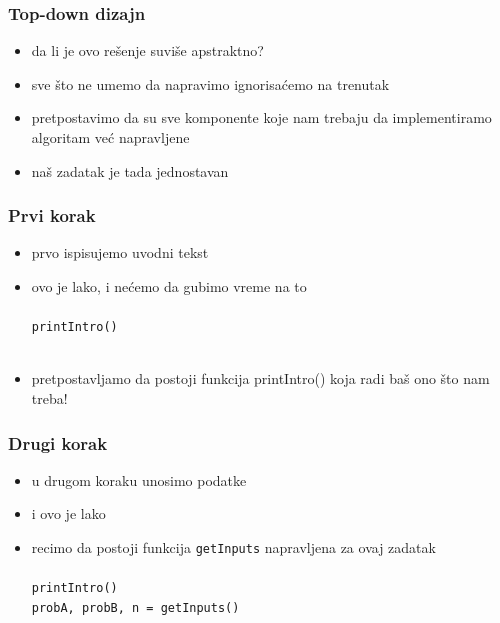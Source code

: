 \documentclass[utf8,compress]{beamer}
\begin{document}
\begin{frame}
  \frametitle{Top-down dizajn}
  \begin{itemize}
    \item da li je ovo rešenje suviše apstraktno? 
    \item sve što ne umemo da napravimo ignorisaćemo na trenutak
    \item pretpostavimo da su sve komponente koje nam trebaju da implementiramo algoritam već napravljene
    \item naš zadatak je tada jednostavan
  \end{itemize}
\end{frame}

\begin{frame}
  \frametitle{Prvi korak}
  \begin{itemize}
    \item prvo ispisujemo uvodni tekst
    \item ovo je lako, i nećemo da gubimo vreme na to \\ \ \\
      \texttt{printIntro()} \\ \ \\
    \item pretpostavljamo da postoji funkcija printIntro() koja radi baš ono što nam treba!
  \end{itemize}
\end{frame}

\begin{frame}
  \frametitle{Drugi korak}
  \begin{itemize}
    \item u drugom koraku unosimo podatke
    \item i ovo je lako
    \item recimo da postoji funkcija \texttt{getInputs} napravljena za ovaj zadatak \\ \ \\
      \texttt{printIntro()} \\
      \texttt{probA, probB, n = getInputs()}
  \end{itemize}
\end{frame}
\end{document}
